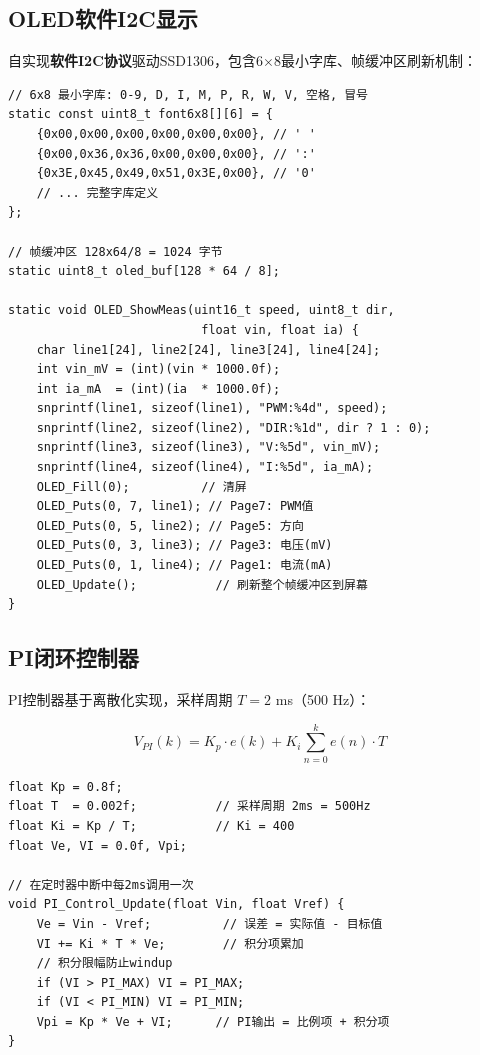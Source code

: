 \documentclass[12pt,a4paper]{ctexart}
\begin{document}
\subsection{OLED软件I2C显示}

自实现\textbf{软件I2C协议}驱动SSD1306，包含6$\times$8最小字库、帧缓冲区刷新机制：

\begin{lstlisting}[style=cstyle, caption={SSD1306 OLED实时数据显示}]
// 6x8 最小字库: 0-9, D, I, M, P, R, W, V, 空格, 冒号
static const uint8_t font6x8[][6] = {
    {0x00,0x00,0x00,0x00,0x00,0x00}, // ' '
    {0x00,0x36,0x36,0x00,0x00,0x00}, // ':'
    {0x3E,0x45,0x49,0x51,0x3E,0x00}, // '0'
    // ... 完整字库定义
};

// 帧缓冲区 128x64/8 = 1024 字节
static uint8_t oled_buf[128 * 64 / 8];

static void OLED_ShowMeas(uint16_t speed, uint8_t dir,
                           float vin, float ia) {
    char line1[24], line2[24], line3[24], line4[24];
    int vin_mV = (int)(vin * 1000.0f);
    int ia_mA  = (int)(ia  * 1000.0f);
    snprintf(line1, sizeof(line1), "PWM:%4d", speed);
    snprintf(line2, sizeof(line2), "DIR:%1d", dir ? 1 : 0);
    snprintf(line3, sizeof(line3), "V:%5d", vin_mV);
    snprintf(line4, sizeof(line4), "I:%5d", ia_mA);
    OLED_Fill(0);          // 清屏
    OLED_Puts(0, 7, line1); // Page7: PWM值
    OLED_Puts(0, 5, line2); // Page5: 方向
    OLED_Puts(0, 3, line3); // Page3: 电压(mV)
    OLED_Puts(0, 1, line4); // Page1: 电流(mA)
    OLED_Update();           // 刷新整个帧缓冲区到屏幕
}
\end{lstlisting}

\subsection{PI闭环控制器}

PI控制器基于离散化实现，采样周期 $T = 2$ ms（500 Hz）：

\begin{equation}
    V_{PI}(k) = K_p \cdot e(k) + K_i \sum_{n=0}^{k} e(n) \cdot T
\end{equation}

\begin{lstlisting}[style=cstyle, caption={PI控制器离散实现（500Hz采样频率）}]
float Kp = 0.8f;
float T  = 0.002f;           // 采样周期 2ms = 500Hz
float Ki = Kp / T;           // Ki = 400
float Ve, VI = 0.0f, Vpi;

// 在定时器中断中每2ms调用一次
void PI_Control_Update(float Vin, float Vref) {
    Ve = Vin - Vref;          // 误差 = 实际值 - 目标值
    VI += Ki * T * Ve;        // 积分项累加
    // 积分限幅防止windup
    if (VI > PI_MAX) VI = PI_MAX;
    if (VI < PI_MIN) VI = PI_MIN;
    Vpi = Kp * Ve + VI;      // PI输出 = 比例项 + 积分项
}
\end{lstlisting}
\end{document}
